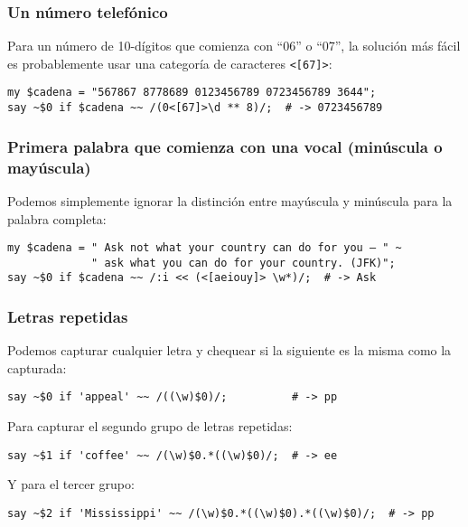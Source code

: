 \subsubsection{Un número telefónico}

Para un número de 10-dígitos que comienza con ``06'' o ``07'', la
solución más fácil es probablemente usar una categoría de caracteres
\verb|<[67]>|:

\begin{verbatim}
my $cadena = "567867 8778689 0123456789 0723456789 3644";
say ~$0 if $cadena ~~ /(0<[67]>\d ** 8)/;  # -> 0723456789
\end{verbatim}

\subsubsection{Primera palabra que comienza con una vocal (minúscula o mayúscula)}

Podemos simplemente ignorar la distinción entre 
mayúscula y minúscula para la palabra completa:
\begin{verbatim}
my $cadena = " Ask not what your country can do for you — " ~
             " ask what you can do for your country. (JFK)";
say ~$0 if $cadena ~~ /:i << (<[aeiouy]> \w*)/;  # -> Ask
\end{verbatim}

\subsubsection{Letras repetidas}

Podemos capturar cualquier letra y chequear si la siguiente es
la misma como la capturada:

\begin{verbatim}
say ~$0 if 'appeal' ~~ /((\w)$0)/;          # -> pp
\end{verbatim}

Para capturar el segundo grupo de letras repetidas:

\begin{verbatim}
say ~$1 if 'coffee' ~~ /(\w)$0.*((\w)$0)/;  # -> ee
\end{verbatim}

Y para el tercer grupo:

\begin{verbatim}
say ~$2 if 'Mississippi' ~~ /(\w)$0.*((\w)$0).*((\w)$0)/;  # -> pp
\end{verbatim}

